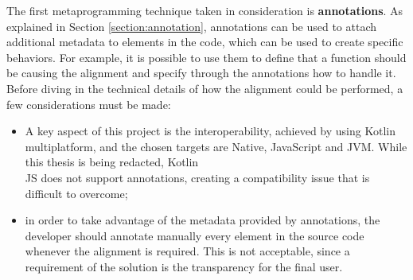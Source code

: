 The first metaprogramming technique taken in consideration is \textbf{annotations}. As explained in Section \ref{section:annotation}, annotations can be used to attach additional metadata to elements in the code, which can be used to create specific behaviors. For example, it is possible to use them to define that a function should be causing the alignment and specify through the annotations how to handle it.\newline
Before diving in the technical details of how the alignment could be performed, a few considerations must be made:
\begin{itemize}
    \item A key aspect of this project is the interoperability, achieved by using Kotlin multiplatform, and the chosen targets are Native, JavaScript and JVM. While this thesis is being redacted, Kotlin\\JS does not support annotations, creating a compatibility issue that is difficult to overcome;
    \item in order to take advantage of the metadata provided by annotations, the developer should annotate manually every element in the source code whenever the alignment is required. This is not acceptable, since a requirement of the solution is the transparency for the final user.
\end{itemize}

